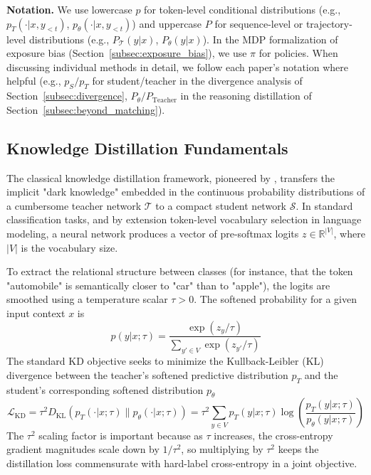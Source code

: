 \documentclass{article} %
\newcommand{\KL}{D_{\mathrm{KL}}}
\newcommand{\ptheta}{p_\theta}
\newcommand{\pteacher}{p_T}
\newcommand{\loss}{\mathcal{L}}
\begin{document}
\textbf{Notation.} We use lowercase $p$ for token-level conditional distributions (e.g., $\pteacher(\cdot|x, y_{<t})$, $\ptheta(\cdot|x, y_{<t})$) and uppercase $P$ for sequence-level or trajectory-level distributions (e.g., $P_{\mathcal{T}}(y|x)$, $P_\theta(y|x)$). In the MDP formalization of exposure bias (Section~\ref{subsec:exposure_bias}), we use $\pi$ for policies. When discussing individual methods in detail, we follow each paper's notation where helpful (e.g., $p_S/p_T$ for student/teacher in the divergence analysis of Section~\ref{subsec:divergence}, $P_\theta/P_{\text{Teacher}}$ in the reasoning distillation of Section~\ref{subsec:beyond_matching}).

\subsection{Knowledge Distillation Fundamentals}
\label{subsec:kd_fundamentals}

The classical knowledge distillation framework, pioneered by \citet{hinton2015distilling}, transfers the implicit "dark knowledge" embedded in the continuous probability distributions of a cumbersome teacher network $\mathcal{T}$ to a compact student network $\mathcal{S}$. In standard classification tasks, and by extension token-level vocabulary selection in language modeling, a neural network produces a vector of pre-softmax logits $z \in \mathbb{R}^{|V|}$, where $|V|$ is the vocabulary size.

To extract the relational structure between classes (for instance, that the token "automobile" is semantically closer to "car" than to "apple"), the logits are smoothed using a temperature scalar $\tau > 0$. The softened probability for a given input context $x$ is
\begin{equation}
    p(y|x; \tau) = \frac{\exp(z_y / \tau)}{\sum_{y' \in V} \exp(z_{y'} / \tau)}
\end{equation}
The standard KD objective seeks to minimize the Kullback-Leibler (KL) divergence between the teacher's softened predictive distribution $\pteacher$ and the student's corresponding softened distribution $\ptheta$
\begin{equation}
    \loss_{\mathrm{KD}} = \tau^2 \KL(\pteacher(\cdot|x; \tau) \parallel \ptheta(\cdot|x; \tau)) = \tau^2 \sum_{y \in V} \pteacher(y|x; \tau) \log \left( \frac{\pteacher(y|x; \tau)}{\ptheta(y|x; \tau)} \right)
\end{equation}
The $\tau^2$ scaling factor is important because as $\tau$ increases, the cross-entropy gradient magnitudes scale down by $1/\tau^2$, so multiplying by $\tau^2$ keeps the distillation loss commensurate with hard-label cross-entropy in a joint objective.
\end{document}
